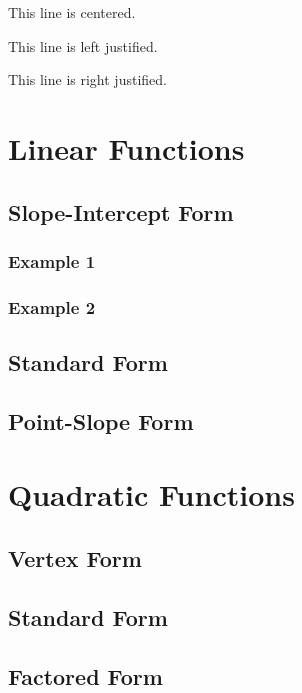 \documentclass[11pt]{article}
\begin{document}
    \vspace{1cm}


    \begin{center}
        This line is centered.
    \end{center}

    \begin{flushleft}
        This line is left justified.
    \end{flushleft}

    \begin{flushright}
        This line is right justified.
    \end{flushright}
    \section{Linear Functions} %
    \subsection{Slope-Intercept Form}
    \subsubsection{Example 1}
    \subsubsection{Example 2}
    \subsection{Standard Form}
    \subsection{Point-Slope Form}
    \section{Quadratic Functions}
    \subsection{Vertex Form}
    \subsection{Standard Form}
    \subsection{Factored Form}
\end{document}
